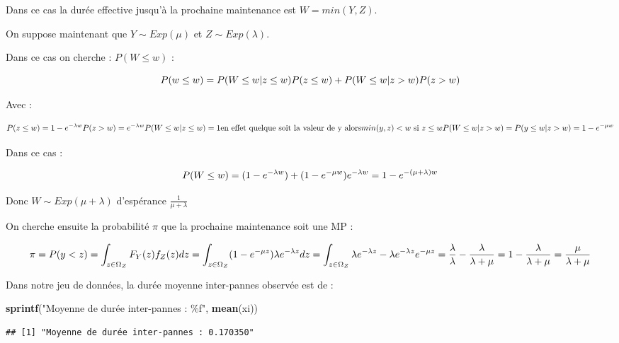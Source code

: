 \documentclass[
]{article}
\newenvironment{Shaded}{\begin{snugshade}}{\end{snugshade}}
\newcommand{\FunctionTok}[1]{\textcolor[rgb]{0.13,0.29,0.53}{\textbf{#1}}}
\newcommand{\NormalTok}[1]{#1}
\newcommand{\StringTok}[1]{\textcolor[rgb]{0.31,0.60,0.02}{#1}}
\begin{document}
Dans ce cas la durée effective jusqu'à la prochaine maintenance est
\(W = min(Y,Z)\).

On suppose maintenant que \(Y \sim Exp(\mu)\) et
\(Z \sim Exp(\lambda)\).

Dans ce cas on cherche : \(P(W \leq w)\) :

\[
P(w \leq w) =
P(W \leq w | z \leq w)P(z \leq w) + \\
P(W \leq w | z > w)P(z > w)
\]

Avec :

\[
P(z \leq w) = 1-e^{-\lambda w} \\
P(z > w) = e^{-\lambda w} \\
P(W \leq w | z \leq w) = 1
\space \mbox{en effet quelque soit la valeur de y alors} \\
min(y,z)<w \mbox{ si } z \leq w \\
P(W \leq w | z > w) = P(y \leq w | z > w) = 1-e^{-\mu w}
\]

Dans ce cas :

\[
P(W \leq w) = (1 - e^{-\lambda w}) + (1- e^{-\mu w})
e^{-\lambda w}\\
= 1 - e^{-(\mu + \lambda) w}
\]

Donc \(W \sim Exp(\mu + \lambda)\) d'espérance \(\frac{1}{\mu+\lambda}\)

On cherche ensuite la probabilité \(\pi\) que la prochaine maintenance
soit une MP :

\[
\pi = P(y<z) = \int_{z \in \Omega_Z} F_Y(z)f_Z(z)dz\\ =
\int_{z \in \Omega_Z}(1-e^{-\mu z})\lambda e^{-\lambda z}dz
= \int_{z \in \Omega_Z} \lambda e^{-\lambda z} - 
\lambda e^{-\lambda z}e^{-\mu z} \\ =
\frac{\lambda}{\lambda} - \frac{\lambda}{\lambda + \mu} = 
1 - \frac{\lambda}{\lambda + \mu} = \frac{\mu}{\lambda + \mu}
\]

Dans notre jeu de données, la durée moyenne inter-pannes observée est de
:

\begin{Shaded}
\begin{Highlighting}[]
\FunctionTok{sprintf}\NormalTok{(}\StringTok{"Moyenne de durée inter{-}pannes : \%f"}\NormalTok{, }\FunctionTok{mean}\NormalTok{(xi))}
\end{Highlighting}
\end{Shaded}

\begin{verbatim}
## [1] "Moyenne de durée inter-pannes : 0.170350"
\end{verbatim}
\end{document}
